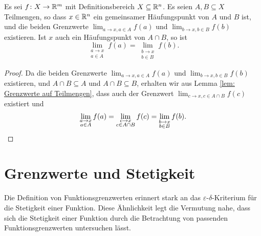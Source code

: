 \documentclass[a4paper,10pt]{article}
\begin{document}
\begin{kor}\label{kor: gemeinsamer Häufungspunkt mit gemeinsamen Grenzwert}
 Es sei $f \colon X \to \mathbb{R}^m$ mit Definitionsbereich $X \subseteq \mathbb{R}^n$. Es seien $A, B \subseteq X$ Teilmengen, so dass $x \in \mathbb{R}^n$ ein gemeinsamer Häufungspunkt von $A$ und $B$ ist, und die beiden Grenzwerte $\lim_{a \to x, a \in A} f(a)$ und $\lim_{b \to x, b \in B} f(b)$ existieren. Ist $x$ auch ein Häufungspunkt von $A \cap B$, so ist
 \[
  \lim_{\substack{a \to x \\ a \in A}} f(a)
  = \lim_{\substack{b \to x \\ b \in B}} f(b).
 \]
\end{kor}
\begin{proof}
 Da die beiden Grenzwerte $\lim_{a \to x, a \in A} f(a)$ und $\lim_{b \to x, b \in B} f(b)$ existieren, und $A \cap B \subseteq A$ und $A \cap B \subseteq B$, erhalten wir aus Lemma \ref{lem: Grenzwerte auf Teilmengen}, dass auch der Grenzwert $\lim_{c \to x, c \in A \cap B} f(c)$ existiert und
 \[
  \lim_{\substack{a \to x \\ a \in A}} f(a)
  = \lim_{\substack{c \to x \\ c \in A \cap B}} f(c)
  = \lim_{\substack{b \to x \\ b \in B}} f(b).
  \qedhere
 \]
\end{proof}





\section{Grenzwerte und Stetigkeit}
Die Definition von Funktionsgrenzwerten erinnert stark an das $\varepsilon$-$\delta$-Kriterium für die Stetigkeit einer Funktion. Diese Ähnlichkeit legt die Vermutung nahe, dass sich die Stetigkeit einer Funktion durch die Betrachtung von passenden Funktionsgrenzwerten untersuchen lässt.
\end{document}
